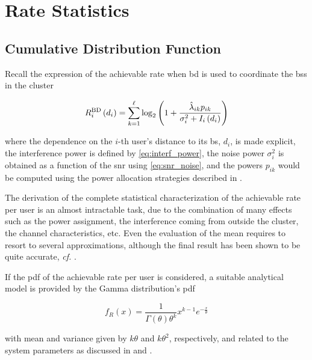 \section{Rate Statistics}\label{sec:stats_rate_stats}
\subsection{Cumulative Distribution Function}\label{ssec:stats_cdf}

Recall the expression of the achievable rate when \gls{bd} is used to coordinate
the \glspl{bs} in the cluster

\begin{equation} \label{eq:stats_achiev_rate}
    R_i^{\text{BD}}\left(d_i\right) = \sum\limits_{k = 1}^{\ell} \log_2 \left(
    1 + \frac{\hat{\lambda}_{ik} p_{ik}}{\sigma_i^2 + I_i\left(d_i\right)} \right)
\end{equation}

\noindent
where the dependence on the $i$-th user's distance to its \gls{bs}, $d_i$, is
made explicit, the interference power is defined by \eqref{eq:interf_power}, the
noise power $\sigma_i^2$ is obtained as a function of the \gls{snr} using
\eqref{eq:snr_noise}, and the powers $p_{ik}$ would be computed using the power
allocation strategies described in .

The derivation of the complete statistical characterization of the achievable
rate per user is an almost intractable task, due to the combination of many
effects such as the power assignment, the interference coming from outside the
cluster, the channel characteristics, etc. Even the evaluation of the mean
requires to resort to several approximations, although the final result has been
shown to be quite accurate, \emph{cf.} .

If the \gls{pdf} of the achievable rate per user is considered, a suitable
analytical model is provided by the Gamma distribution's \gls{pdf}

\begin{equation} \label{eq:gamma_pdf}
   f_{R}\left(x\right) = \frac{1}{\Gamma\left(\theta\right)\theta^k}x^{k-1}
   e^{-\frac{x}{\theta}}
\end{equation}

\noindent
with mean and variance given by $k\theta$ and $k\theta^2$, respectively, and
related to the system parameters as discussed in  and
.

